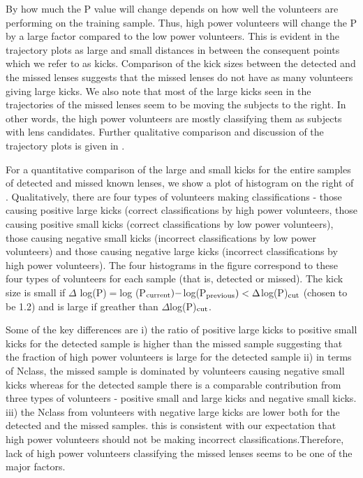 \documentclass[useAMS,usenatbib,a4paper]{mn2e}
\begin{document}
By how much the P value will change depends on how well the
volunteers are performing on the training sample. Thus, high power
volunteers will change the P by a large factor compared to the low
power volunteers. This is evident in the trajectory plots as large and
small distances in between the consequent points which we refer to as
kicks. Comparison of the kick sizes between the detected
and the missed lenses suggests that the missed lenses do not have as
many volunteers giving large kicks. We also note that most of the large
kicks seen in the trajectories of the missed lenses seem to be moving
the subjects to the right. In other words, the high power volunteers
are mostly classifying them as subjects with lens candidates. Further
qualitative comparison and discussion of the trajectory plots is given
in .

For a quantitative comparison of the large and small kicks for the
entire samples of detected and missed known lenses, we show a plot of
histogram on the right of . Qualitatively, there are
four types of volunteers making classifications - those causing positive
large kicks (correct classifications by high power volunteers, those
causing positive small kicks (correct classifications by low power
volunteers), those causing negative small kicks (incorrect
classifications by low power volunteers) and those causing negative
large kicks (incorrect classifications by high power volunteers). The
four histograms in the figure correspond to these four types of
volunteers for each sample (that is, detected or missed). The kick size
is small if $\Delta$ log(P)$=$log (P$_{\rm current}) - $log(P$_{\rm
previous}) < \Delta$log(P)$_{\rm cut}$ (chosen to be 1.2) and is large
if greather than $\Delta$log(P)$_{\rm cut}$.

Some of the key differences are i) the ratio of positive large kicks to
positive small kicks for the detected sample is higher than the missed
sample suggesting that the fraction of high power volunteers is large
for the detected sample ii) in terms of Nclass, the missed sample is
dominated by volunteers causing negative small kicks whereas for the
detected sample there is a comparable contribution from three types of
volunteers - positive small and large kicks and negative small kicks.
iii) the Nclass from volunteers with negative large kicks are lower both
for the detected and the missed samples. this is consistent with our
expectation that high power volunteers should not be making incorrect
classifications.Therefore, lack of high power volunteers classifying
the missed lenses seems to be one of the major factors.
\end{document}
